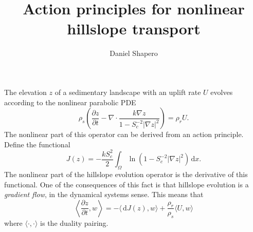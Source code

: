 \documentclass{article}
\title{Action principles for nonlinear hillslope transport}
\author{Daniel Shapero}
\date{}
\theoremstyle{definition}
\theoremstyle{plain}
\newcommand{\ud}{\hspace{2pt}\mathrm{d}}
\begin{document}
\maketitle

The elevation $z$ of a sedimentary landscape with an uplift rate $U$ evolves according to the nonlinear parabolic PDE
\begin{equation}
    \rho_s\left(\frac{\partial z}{\partial t} - \nabla\cdot\frac{k\nabla z}{1 - S_c^{-2}|\nabla z|^2}\right) = \rho_r U.
\end{equation}
The nonlinear part of this operator can be derived from an action principle.
Define the functional
\begin{equation}
    J(z) = -\frac{k S_c^2}{2}\int_\Omega \ln\left(1 - S_c^{-2}|\nabla z|^2\right)\ud x.
\end{equation}
The nonlinear part of the hillslope evolution operator is the derivative of this functional.
One of the consequences of this fact is that hillslope evolution is a \emph{gradient flow}, in the dynamical systems sense.
This means that
\begin{equation}
    \left\langle\frac{\partial z}{\partial t}, w\right\rangle = -\langle \ud J(z), w\rangle + \frac{\rho_r}{\rho_s}\langle U, w\rangle
\end{equation}
where $\langle\cdot, \cdot\rangle$ is the duality pairing.
\end{document}
